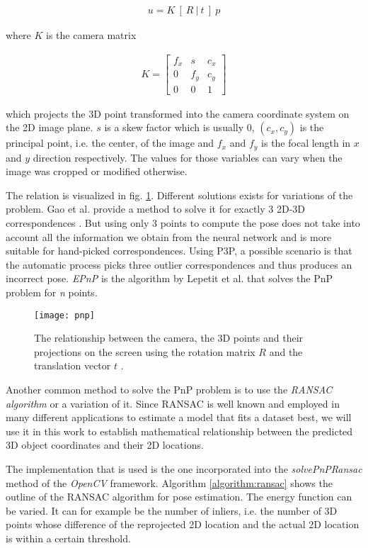 \begin{align}
 u = K \ [ \ R \ | \ t \ ] \ p
\end{align} 

where $K$ is the camera matrix

\begin{align}
K = \begin{bmatrix}
f_x & s & c_x \\
0 & f_y & c_y \\
0 & 0 & 1 
\end{bmatrix}
\end{align}

which projects the 3D point transformed into the camera coordinate system on the 2D image plane. $s$ is a skew factor which is usually $0$, $(c_x, c_y)$ is the principal point, i.e. the center, of the image and $f_x$ and $f_y$ is the focal length in $x$ and $y$ direction respectively. The values for those variables can vary when the image was cropped or modified otherwise.

The relation is visualized in fig. \ref{fig:pnp}. Different solutions exists for variations of the problem. Gao et al. provide a method to solve it for exactly 3 2D-3D correspondences \cite{p3p}. But using only 3 points to compute the pose does not take into account all the information we obtain from the neural network and is more suitable for hand-picked correspondences. Using P3P, a possible scenario is that the automatic process picks three outlier correspondences and thus produces an incorrect pose. \textit{EPnP} \cite{epnp} is the algorithm by Lepetit et al. that solves the PnP problem for \textit{n} points.

\begin{figure}[!tbp]
	\centering
    \texttt{[image: pnp]}
    \caption{The relationship between the camera, the 3D points and their projections on the screen using the rotation matrix $R$ and the translation vector $t$ \cite{opencv_pnp}.}
    	\label{fig:pnp}
\end{figure} 

Another common method to solve the PnP problem is to use the \textit{RANSAC algorithm} \cite{ransac} or a variation of it. Since RANSAC is well known and employed in many different applications to estimate a model that fits a dataset best, we will use it in this work to establish mathematical relationship between the predicted 3D object coordinates and their 2D locations. 

The implementation that is used is the one incorporated into the \textit{solvePnPRansac} method of the \textit{OpenCV} \cite{opencv} framework. Algorithm \ref{algorithm:ransac} shows the outline of the RANSAC algorithm for pose estimation. The energy function can be varied. It can for example be the number of inliers, i.e. the number of 3D points whose difference of the reprojected 2D location and the actual 2D location is within a certain threshold.

